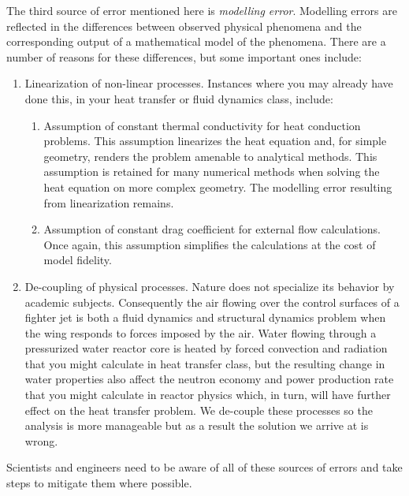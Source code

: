 The third source of error mentioned here is \emph{modelling error}.  Modelling errors are reflected in the differences between observed physical phenomena and the corresponding output of a mathematical model of the phenomena.  There are a number of reasons for these differences, but some important ones include:
\begin{enumerate}
\item Linearization of non-linear processes.  Instances where you may already have done this, in your heat transfer or fluid dynamics class, include:
\begin{enumerate}
\item Assumption of constant thermal conductivity for heat conduction problems.  This assumption linearizes the heat equation and, for simple geometry, renders the problem amenable to analytical methods.  This assumption is retained for many numerical methods when solving the heat equation on more complex geometry.  The modelling error resulting from linearization remains.

\item Assumption of constant drag coefficient for external flow calculations.  Once again, this assumption simplifies the calculations at the cost of model fidelity.
\end{enumerate}

\item De-coupling of physical processes.  Nature does not specialize its behavior by academic subjects.  Consequently the air flowing over the control surfaces of a fighter jet is both a fluid dynamics and structural dynamics problem when the wing responds to forces imposed by the air.  Water flowing through a pressurized water reactor core is heated by forced convection and radiation that you might calculate in heat transfer class, but the resulting change in water properties also affect the neutron economy and power production rate that you might calculate in reactor physics which, in turn, will have further effect on the heat transfer problem.  We de-couple these processes so the analysis is more manageable but as a result the solution we arrive at is wrong.  

\end{enumerate}  
Scientists and engineers need to be aware of all of these sources of errors and take steps to mitigate them where possible.



